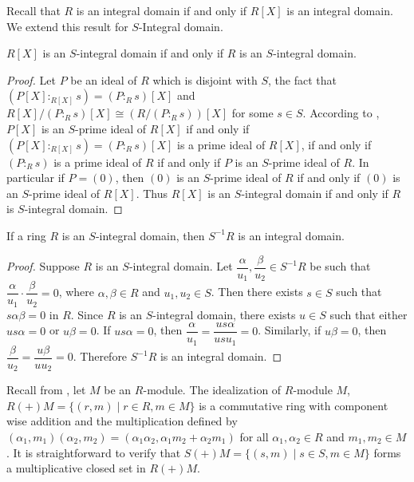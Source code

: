 \documentclass[11pt]{article}
\begin{document}
	Recall that $R$ is an integral domain if and only if $R[X]$ is an integral domain. We extend this result for $S$-Integral domain.
	\begin{prop}
		$R[X]$ is an $S$-integral domain if and only if $R$ is an $S$-integral domain.
	\end{prop}
	\begin{proof}
		Let $P$ be an ideal of $R$ which is disjoint with $S$, the fact that $(P[X]:_{R[X]} s)=(P:_R s)[X]$ and $R[X] / (P:_R s)[X] \cong (R/(P:_R s))[X]$ for some $s\in S$. According to \cite[Proposition 1]{ah20}, $P[X]$ is an $S$-prime ideal of $R[X]$ if and only if $(P[X]: _{R[X]} s)=(P:_R s)[X]$ is a prime ideal of $R[X]$, if and only if $(P:_R s)$ is a prime ideal of $R$ if and only if $P$ is an $S$-prime ideal of $R$. In particular if $P=(0)$, then $(0)$ is an $S$-prime ideal of $R$ if and only if $(0)$ is an $S$-prime ideal of $R[X]$. Thus $R[X]$ is an $S$-integral domain if and only if $R$ is $S$-integral domain.
	\end{proof}
	\begin{prop}\label{local}
		If a ring $R$ is an $S$-integral domain, then $S^{-1}R$ is an integral domain.
	\end{prop}
	\begin{proof}
		Suppose $R$ is an $S$-integral domain. Let $\dfrac{\alpha}{u_1}, \dfrac{\beta}{u_2} \in S^{-1}R$ be such that $\dfrac{\alpha}{u_1} \cdot \dfrac{\beta}{u_2} = 0$, where $\alpha, \beta \in R$ and $u_1, u_2 \in S$. Then there exists $s \in S$ such that $s\alpha\beta = 0$ in $R$. Since $R$ is an $S$-integral domain, there exists $u \in S$ such that either $us\alpha = 0$ or $u\beta = 0$. If $us\alpha= 0$, then $\dfrac{\alpha}{u_1} = \dfrac{us\alpha}{us u_1} = 0$. Similarly, if $u\beta = 0$, then $\dfrac{\beta}{u_2} = \dfrac{u\beta}{uu_2} = 0$. Therefore $S^{-1}R$ is an integral domain.
	\end{proof}
	
	Recall from \cite{ad09}, let $M$ be an $R$-module. The  idealization of $R$-module $M$, $R(+)M=\{(r, m)\mid r\in R, m\in M\}$ is a commutative ring with component wise addition and the multiplication defined by $(\alpha_1, m_1)(\alpha_2, m_2)= (\alpha_1\alpha_2, \alpha_1m_2 + \alpha_2m_1)$ for all $\alpha_1, \alpha_2 \in R$ and $m_1, m_2 \in M$. It is straightforward to verify that $S(+) M = \{(s, m) \mid s \in S, m \in M\}$ forms a multiplicative closed set in $R(+)M$.
	
\end{document}
